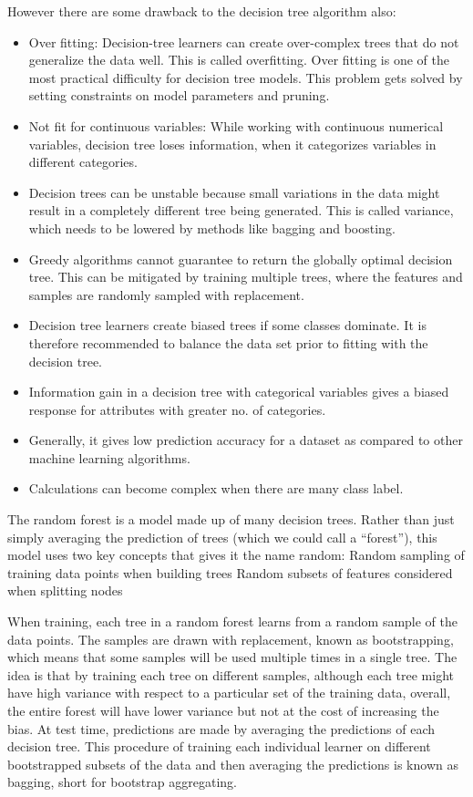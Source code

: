 \documentclass[12pt]{article}
\begin{document}
However there are some drawback to the decision tree algorithm also:
\begin{itemize}
\item
Over fitting: Decision-tree learners can create over-complex trees that do not generalize the data well. This is called overfitting. Over fitting is one of the most practical difficulty for decision tree models. This problem gets solved by setting constraints on model parameters and pruning.
\item
Not fit for continuous variables: While working with continuous numerical variables, decision tree loses information, when it categorizes variables in different categories.
\item
Decision trees can be unstable because small variations in the data might result in a completely different tree being generated. This is called variance, which needs to be lowered by methods like bagging and boosting.
\item
Greedy algorithms cannot guarantee to return the globally optimal decision tree. This can be mitigated by training multiple trees, where the features and samples are randomly sampled with replacement.
\item
Decision tree learners create biased trees if some classes dominate. It is therefore recommended to balance the data set prior to fitting with the decision tree.
\item
Information gain in a decision tree with categorical variables gives a biased response for attributes with greater no. of categories.
\item
Generally, it gives low prediction accuracy for a dataset as compared to other machine learning algorithms.
\item
Calculations can become complex when there are many class label.
\end{itemize}



The random forest is a model made up of many decision trees. Rather than just simply averaging the prediction of trees (which we could call a “forest”), this model uses two key concepts that gives it the name random:
Random sampling of training data points when building trees
Random subsets of features considered when splitting nodes

When training, each tree in a random forest learns from a random sample of the data points. The samples are drawn with replacement, known as bootstrapping, which means that some samples will be used multiple times in a single tree. The idea is that by training each tree on different samples, although each tree might have high variance with respect to a particular set of the training data, overall, the entire forest will have lower variance but not at the cost of increasing the bias. At test time, predictions are made by averaging the predictions of each decision tree. This procedure of training each individual learner on different bootstrapped subsets of the data and then averaging the predictions is known as bagging, short for bootstrap aggregating.
\end{document}
